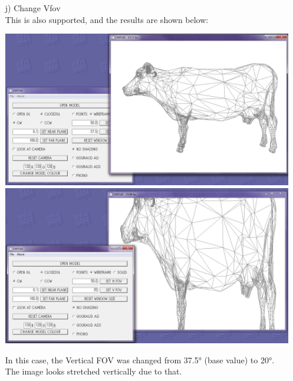 \documentclass[12pt]{article}
\begin{document}
\begin{itemize}
\begin{itemize}
\item[j)] Change Vfov\\
This is also supported, and the results are shown below:
\begin{center}
\includegraphics[scale=0.4]{8.png}
\includegraphics[scale=0.4]{13.png}
\end{center}
In this case, the Vertical FOV was changed from 37.5° (base value) to 20°. The image looks stretched vertically due to that.


\end{itemize}
\end{itemize}
\end{document}
